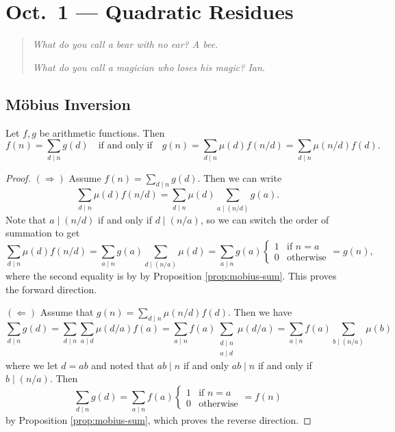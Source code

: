\chapter{Oct.~1 --- Quadratic Residues}

\begin{quote}
  \emph{What do you call a bear with no
  ear? A bee.}

  \emph{What do you call a magician
  who loses his magic? Ian.}
\end{quote}

\section{M\"obius Inversion}

\begin{theorem}
  Let $f, g$ be arithmetic functions.
  Then
  \[
    f(n) = \sum_{d \mid n} g(d)
    \quad \text{if and only if} \quad
    g(n) = \sum_{d \mid n} \mu(d) f(n / d)
    = \sum_{d \mid n} \mu(n / d) f(d).
  \]
\end{theorem}

\begin{proof}
  $(\Rightarrow)$ Assume
  $f(n) = \sum_{d \mid n} g(d)$.
  Then we can write
  \[
    \sum_{d \mid n} \mu(d) f(n / d)
    = \sum_{d \mid n} \mu(d)
    \sum_{a \mid (n / d)} g(a).
  \]
  Note that $a \mid (n / d)$ if and only
  if $d \mid (n / a)$, so we can
  switch the order of summation to get
  \[
    \sum_{d \mid n} \mu(d) f(n / d)
    = \sum_{a \mid n} g(a)
    \sum_{d \mid (n / a)} \mu(d)
    = \sum_{a \mid n} g(a)
    \begin{cases}
      1 & \text{if } n = a \\
      0 & \text{otherwise}
    \end{cases}
    = g(n),
  \]
  where the second equality is by
  by Proposition \ref{prop:mobius-sum}.
  This proves the forward direction.

  $(\Leftarrow)$ Assume
  that $g(n) = \sum_{d \mid n} \mu(n / d) f(d)$.
  Then we have
  \[
    \sum_{d \mid n} g(d)
    = \sum_{d \mid n} \sum_{a \mid d}
    \mu(d / a) f(a)
    = \sum_{a \mid n} f(a)
    \sum_{\substack{d \mid n \\ a \mid d}} \mu(d / a)
    = \sum_{a \mid n} f(a)
    \sum_{b \mid (n / a)} \mu(b)
  \]
  where we let
  $d = ab$ and noted that
  $ab \mid n$ if and only $ab \mid n$
  if and only if $b \mid (n / a)$.
  Then
  \[
    \sum_{d \mid n} g(d)
    = \sum_{a \mid n} f(a)
    \begin{cases}
      1 & \text{if } n = a \\
      0 & \text{otherwise}
    \end{cases}
    = f(n)
  \]
  by Proposition \ref{prop:mobius-sum},
  which proves the reverse direction.
\end{proof}

